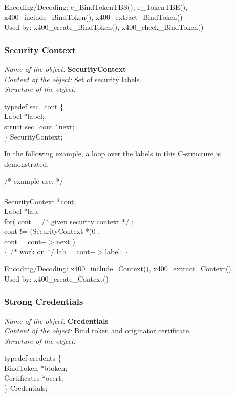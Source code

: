 Encoding/Decoding: e\_BindTokenTBS(), e\_TokenTBE(),
x400\_include\_Bind\-To\-ken(), x400\_extract\_BindToken() \\
Used by: x400\_create\_BindToken(), x400\_check\_BindToken()

\subsubsection{Security Context}
\label{x4_SecCont}
{\em Name of the object:} {\bf SecurityContext} \\
{\em Content of the object:} Set of security labels. \\
{\em Structure of the object:}

{\small
\btab
\1 typedef sec\_cont \{ \\
\2      Label \2  *label; \\
\2      struct sec\_cont \2 *next; \\
\1 \} SecurityContext; \\
\etab
}

In the following example,
a loop over the labels in this C-structure is demonstrated:

{\small
\btab
\1 /* example use: */   \\ \\
\2      SecurityContext \2 *cont; \\
\2      Label           \2 *lab;  \\
\2      for( cont = /* given security context */ ; \\
\3         cont != (SecurityContext *)0 ; \\
\3         cont = cont$->$next ) \\
\2         \{ /* work on */ lab = cont$->$label; \} \\
\etab
}

Encoding/Decoding: x400\_include\_Context(), x400\_extract\_Context() \\
Used by: x400\_create\_Context()

\subsubsection{Strong Credentials}
\label{x4_Creds}
{\em Name of the object:} {\bf Credentials} \\
{\em Content of the object:} Bind token and originator certificate. \\
{\em Structure of the object:}

{\small
\btab
\1 typedef credents \{ \\
\2      BindToken \2  *btoken; \\
\2      Certificates \2 *ocert; \\
\1 \} Credentials; \\
\etab
}

